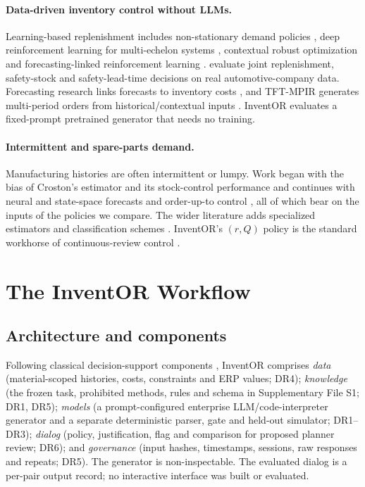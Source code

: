 \documentclass[preprint,12pt,nonatbib]{elsarticle}
\let\cite\parencite
\begin{document}
\paragraph{Data-driven inventory control without LLMs.}
Learning-based replenishment includes non-stationary demand policies \cite{ren2024datadriven}, deep reinforcement learning for multi-echelon systems \cite{kolyaei2025rl, stranieri2024drl}, contextual robust optimization \cite{wang2026contextual} and forecasting-linked reinforcement learning \cite{schett2026rlorder}. \textcite{gabellini2026novel} evaluate joint replenishment, safety-stock and safety-lead-time decisions on real automotive-company data. Forecasting research links forecasts to inventory costs \cite{kourentzes2020optimising}, and TFT-MPIR generates multi-period orders from historical/contextual inputs \cite{guo2025tftmpir}. InventOR evaluates a fixed-prompt pretrained generator that needs no training.

\paragraph{Intermittent and spare-parts demand.}
Manufacturing histories are often intermittent or lumpy. Work began with the bias of Croston's estimator and its stock-control performance \cite{syntetos2001bias, syntetos2006stock} and continues with neural \cite{kourentzes2013neural} and state-space \cite{svetunkov2023iets} forecasts and order-up-to control \cite{rostamitabar2023orderupto}, all of which bear on the inputs of the policies we compare. The wider literature adds specialized estimators and classification schemes \cite{croston1972forecasting, syntetos2005accuracy, prak2021robust, babai2026fifty}. InventOR's $(r,Q)$ policy is the standard workhorse of continuous-review control \cite{hadley1963analysis, porteus2002foundations, silver2017inventory}.


\FloatBarrier

\section{The InventOR Workflow}
\label{sec:aid}

\subsection{Architecture and components}
\label{subsec:architecture}
Following classical decision-support components \cite{sprague1980framework, shim2002past}, InventOR comprises \emph{data} (material-scoped histories, costs, constraints and ERP values; DR4); \emph{knowledge} (the frozen task, prohibited methods, rules and schema in Supplementary File S1; DR1, DR5); \emph{models} (a prompt-configured enterprise LLM/code-interpreter generator and a separate deterministic parser, gate and held-out simulator; DR1--DR3); \emph{dialog} (policy, justification, flag and comparison for proposed planner review; DR6); and \emph{governance} (input hashes, timestamps, sessions, raw responses and repeats; DR5). The generator is non-inspectable. The evaluated dialog is a per-pair output record; no interactive interface was built or evaluated.
\end{document}
